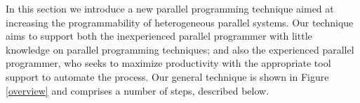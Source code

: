 \documentclass[smallextended]{svjour3}
\begin{document}
\noindent
In this section we introduce a new parallel programming technique aimed at increasing the programmability of heterogeneous 
parallel systems.
Our technique aims to support both the inexperienced parallel programmer with 
little knowledge on parallel programming techniques; and also the experienced parallel programmer, who
seeks to maximize productivity with the appropriate tool support to automate the process. 
Our general technique is shown in Figure \ref{overview} and comprises a number of steps, described below.
\end{document}
